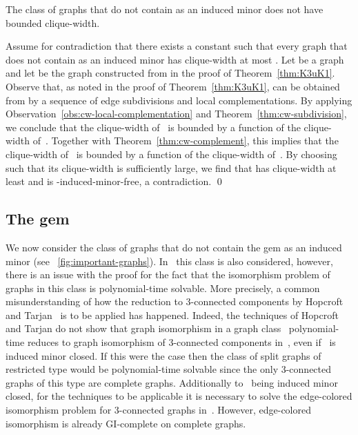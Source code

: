 \documentclass[envcountsame,envcountsect,11pt,a4paper]{llncs}
\renewenvironment{proof}{\begin{Proof}}{\qed\end{Proof}}
\newcommand{\figref}[1]{\figurename~\ref{#1}}
\begin{document}
\begin{theorem}
The class of graphs that do not contain  as an induced minor does not have bounded clique-width.
\end{theorem}
\begin{proof}
Assume for contradiction that there exists a constant  such that every graph that does not contain  as an induced
minor has clique-width at most .
Let  be a graph and let  be the graph constructed from  in the proof of Theorem~\ref{thm:K3uK1}. Observe that, as
noted in the proof of Theorem~\ref{thm:K3uK1},  can be obtained from  by a sequence of edge subdivisions and local
complementations. By applying Observation~\ref{obs:cw-local-complementation} and Theorem~\ref{thm:cw-subdivision}, we conclude that the
clique-width of~ is bounded by a function of the clique-width of~. Together with Theorem~\ref{thm:cw-complement}, this implies that
the clique-width of~ is bounded by a function of the clique-width of~. By choosing~ such that its clique-width is
sufficiently large, we find that  has clique-width at least  and is -induced-minor-free, a contradiction.
\end{proof}

\subsection{The gem}\label{subsection:gem}

We now consider the class of graphs that do not contain the gem as an induced minor (see
\figref{fig:important-graphs}). In~\cite{Ponomarenko88} this class is also considered, however, there is an issue with the proof for the
fact that the isomorphism problem of graphs in this class is polynomial-time solvable. More precisely, a common misunderstanding of how the
reduction to 3-connected components by Hopcroft and Tarjan~\cite{DBLP:conf/coco/HopcroftT72} is to be applied has happened.
Indeed, the techniques of Hopcroft and Tarjan do not show that graph
isomorphism in a graph class~ polynomial-time reduces to
graph isomorphism of 3-connected components in~, even
if~ is induced minor closed. If this were the case
then the class of split graphs of restricted type would be
polynomial-time solvable since the only 3-connected graphs of this type
are complete graphs. Additionally to~ being induced minor closed,
for the techniques to be applicable it is necessary to solve the
edge-colored isomorphism problem for 3-connected graphs
in~.  However, edge-colored isomorphism is already
GI-complete on complete graphs.
\end{document}
